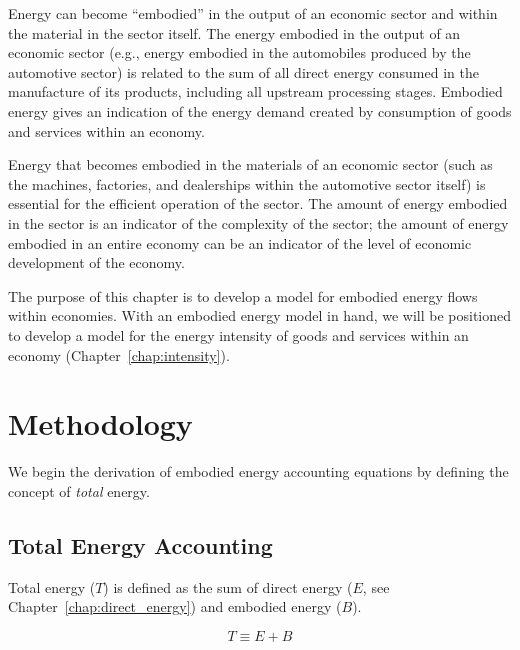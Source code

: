 Energy can become ``embodied'' in the output of an economic sector
and within the material in the sector itself.
The energy embodied in the output of an economic sector 
(e.g., energy embodied in the automobiles produced by the automotive sector)
is related to the sum of all direct energy
consumed in the manufacture of its products, 
including all upstream processing stages. 
Embodied energy gives an indication 
of the energy demand created by consumption of goods and services
within an economy.

Energy that becomes embodied in the materials of an economic sector 
(such as the machines, factories, and dealerships 
within the automotive sector itself) is essential for 
the efficient operation of the sector. The amount of energy
embodied in the sector is an indicator of the complexity of
the sector; the amount of energy embodied in an entire economy
can be an indicator of the level of 
economic development
of the economy.

The purpose of this chapter is to develop a model for 
embodied energy flows within economies. 
With an embodied energy model in hand, we will be positioned
to develop a model for the energy intensity 
of goods and services within an economy 
(Chapter~\ref{chap:intensity}).


\section{Methodology}
\label{sec:embodied_methodology}

We begin the derivation of embodied energy accounting
equations by defining the concept of 
\emph{total} energy. 


\subsection{Total Energy Accounting}
\label{sec:total_energy_accounting}

Total energy ($T$)
is defined as the sum of 
direct energy 
($E$, see Chapter~\ref{chap:direct_energy}) 
and embodied energy ($B$).

\begin{equation} \label{eq:T_def}
	T \equiv E + B
\end{equation}

